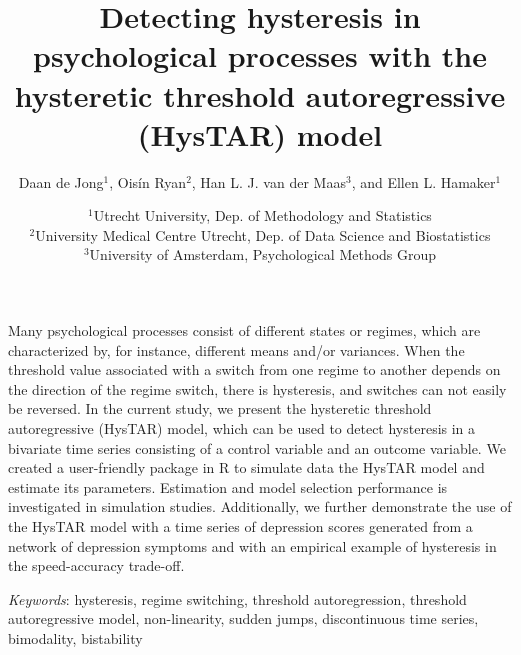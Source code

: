 \documentclass{article}
\title{Detecting hysteresis in psychological processes with the hysteretic threshold autoregressive (HysTAR) model}
\author{Daan de Jong$^1$, Ois\'{i}n Ryan$^2$, Han L. J. van der Maas$^3$, and Ellen L. Hamaker$^1$}
\date{
$^1$Utrecht University, Dep. of Methodology and Statistics \\
$^2$University Medical Centre Utrecht, Dep. of Data Science and Biostatistics \\
$^3$University of Amsterdam, Psychological Methods Group
}
\renewenvironment{abstract}
 {\small
  \begin{center}
  \bfseries \abstractname\vspace{-.5em}\vspace{0pt}
  \end{center}
  \list{}{%
    \setlength{\leftmargin}{10mm}
    \setlength{\rightmargin}{\leftmargin}%
  }%
  \item\relax}
 {\endlist}
\begin{document}
\maketitle

\begin{abstract}
Many psychological processes consist of different states or regimes, which are characterized by, for instance, different means and/or variances.
When the threshold value associated with a switch from one regime to another depends on the direction of the regime switch, there is hysteresis, and switches can not easily be reversed.
In the current study, we present the hysteretic threshold autoregressive (HysTAR) model, which can be used to detect hysteresis in a bivariate time series consisting of a control variable and an outcome variable.
We created a user-friendly package in \textsf{R} to simulate data the HysTAR model and estimate its parameters.
Estimation and model selection performance is investigated in simulation studies.
Additionally, we further demonstrate the use of the HysTAR model with a time series of depression scores generated from a network of depression symptoms and with an empirical example of hysteresis in the speed-accuracy trade-off. \newline
\end{abstract}

\noindent 
\textit{Keywords}: hysteresis, regime switching, threshold autoregression, threshold autoregressive model, non-linearity, sudden jumps, discontinuous time series, bimodality, bistability
\end{document}
